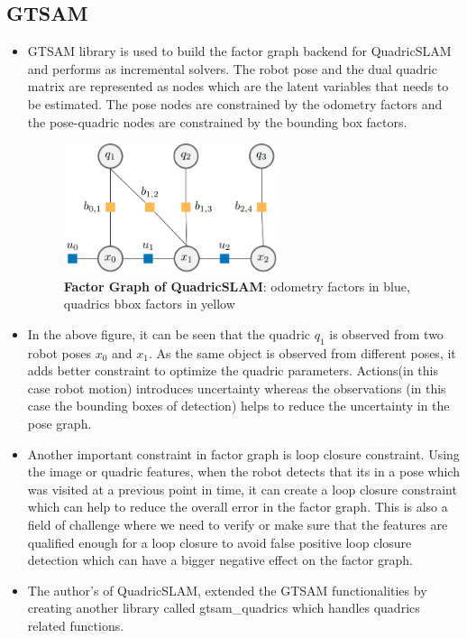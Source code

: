 \documentclass[report.tex]{subfiles}
\begin{document}
\subsection{GTSAM}
\begin{itemize}
\item GTSAM\cite{gtsam} library is used to build the factor graph backend for QuadricSLAM and performs as incremental solvers. The robot pose and the dual quadric matrix are represented as nodes which are the latent variables that needs to be estimated. The pose nodes are constrained by the odometry factors and the pose-quadric nodes are constrained by the bounding box factors.

\begin{figure}[H]
\centering
\includegraphics[width=0.6\textwidth, height=0.2\textheight] {Images/factor_graph.png}
\caption{\centering\textbf{Factor Graph of QuadricSLAM}: odometry factors in blue, quadrics bbox factors in yellow \cite{orientation_factor}}
\label{fig:factor_graph}
\end{figure}
\item In the above figure, it can be seen that the quadric $q_1$ is observed from two robot poses $x_0$ and $x_1$. As the same object is observed from different poses, it adds better constraint to optimize the quadric parameters. Actions(in this case robot motion) introduces uncertainty whereas the observations (in this case the bounding boxes of detection) helps to reduce the uncertainty in the pose graph.
\item Another important constraint in factor graph is loop closure constraint. Using the image or quadric features, when the robot detects that its in a pose which was visited at a previous point in time, it can create a loop closure constraint which can help to reduce the overall error in the factor graph. This is also a field of challenge where we need to verify or make sure that the features are qualified enough for a loop closure to avoid false positive loop closure detection which can have a bigger negative effect on the factor graph.
\item The author's of QuadricSLAM, extended the GTSAM functionalities by creating another library called gtsam\_quadrics which handles quadrics related functions.

\end{itemize}
\end{document}
